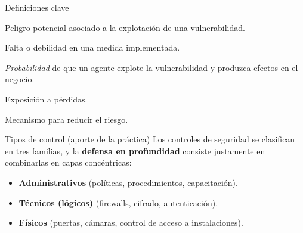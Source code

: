 \documentclass[11pt,a4paper]{article}
\begin{document}
\begin{center}
\end{center}

\begin{defbox}{Definiciones clave}
\begin{description}[leftmargin=0pt,labelsep=0.4em,style=nextline,itemsep=2pt]
  \item[Amenaza (threat)] Peligro potencial asociado a la explotación de una vulnerabilidad.
  \item[Vulnerabilidad] Falta o debilidad en una medida implementada.
  \item[Riesgo (risk)] \emph{Probabilidad} de que un agente explote la vulnerabilidad y
        produzca efectos en el negocio.
  \item[Exposición] Exposición a pérdidas.
  \item[Medida / control (safeguard)] Mecanismo para reducir el riesgo.
\end{description}
\end{defbox}

\begin{practbox}{Tipos de control (aporte de la práctica)}
Los controles de seguridad se clasifican en tres familias, y la \textbf{defensa en profundidad}
consiste justamente en combinarlas en capas concéntricas:
\begin{itemize}[leftmargin=1.4em,itemsep=1pt]
  \item \textbf{Administrativos} (políticas, procedimientos, capacitación).
  \item \textbf{Técnicos (lógicos)} (firewalls, cifrado, autenticación).
  \item \textbf{Físicos} (puertas, cámaras, control de acceso a instalaciones).
\end{itemize}
\end{practbox}
\end{document}
